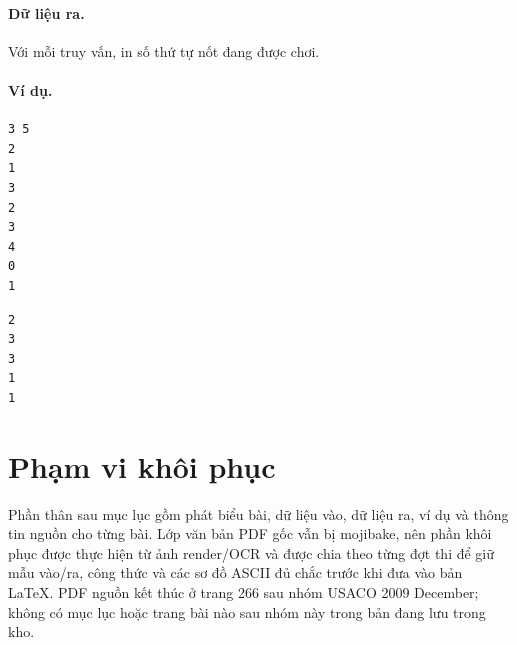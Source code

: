 \documentclass[11pt]{article}
\newcommand{\iosec}[1]{\paragraph{#1}}
\begin{document}
\iosec{Dữ liệu ra.}
Với mỗi truy vấn, in số thứ tự nốt đang được chơi.

\iosec{Ví dụ.}
\begin{verbatim}
3 5
2
1
3
2
3
4
0
1
\end{verbatim}

\begin{verbatim}
2
3
3
1
1
\end{verbatim}

\section{Phạm vi khôi phục}

Phần thân sau mục lục gồm phát biểu bài, dữ liệu vào, dữ liệu ra, ví dụ và
thông tin nguồn cho từng bài. Lớp văn bản PDF gốc vẫn bị mojibake, nên phần
khôi phục được thực hiện từ ảnh render/OCR và được chia theo từng đợt thi để
giữ mẫu vào/ra, công thức và các sơ đồ ASCII đủ chắc trước khi đưa vào bản
LaTeX. PDF nguồn kết thúc ở trang 266 sau nhóm USACO 2009 December; không có
mục lục hoặc trang bài nào sau nhóm này trong bản đang lưu trong kho.
\end{document}
